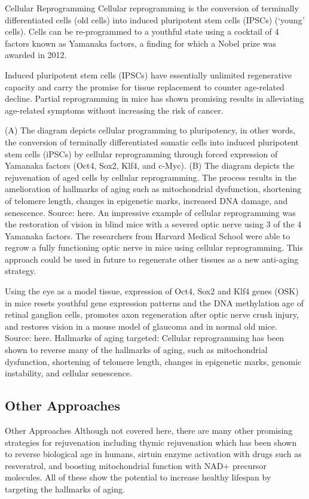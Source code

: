 \begin{frame}[c]{Cellular Reprogramming}
    Cellular reprogramming is the conversion of terminally differentiated cells (old cells) into induced pluripotent stem cells (IPSCs) (‘young’ cells). Cells can be re-programmed to a youthful state using a cocktail of 4 factors known as Yamanaka factors, a finding for which a Nobel prize was awarded in 2012. 

Induced pluripotent stem cells (IPSCs) have essentially unlimited regenerative capacity and carry the promise for tissue replacement to counter age-related decline. Partial reprogramming in mice has shown promising results in alleviating age-related symptoms without increasing the risk of cancer. 


(A) The diagram depicts cellular programming to pluripotency, in other words, the conversion of terminally differentiated somatic cells into induced pluripotent stem cells (iPSCs) by cellular reprogramming through forced expression of Yamanaka factors (Oct4, Sox2, Klf4, and c-Myc). (B) The diagram depicts the rejuvenation of aged cells by cellular reprogramming. The process results in the amelioration of hallmarks of aging such as mitochondrial dysfunction, shortening of telomere length, changes in epigenetic marks, increased DNA damage, and senescence. Source: here. 
An impressive example of cellular reprogramming was the restoration of vision in blind mice with a severed optic nerve using 3 of the 4 Yamanaka factors. The researchers from Harvard Medical School were able to regrow a fully functioning optic nerve in mice using cellular reprogramming. This approach could be used in future to regenerate other tissues as a new anti-aging strategy. 


Using the eye as a model tissue, expression of Oct4, Sox2 and Klf4 genes (OSK) in mice resets youthful gene expression patterns and the DNA methylation age of retinal ganglion cells, promotes axon regeneration after optic nerve crush injury, and restores vision in a mouse model of glaucoma and in normal old mice. Source: here. 
Hallmarks of aging targeted: Cellular reprogramming has been shown to reverse many of the hallmarks of aging, such as mitochondrial dysfunction, shortening of telomere length, changes in epigenetic marks, genomic instability, and cellular senescence.
\end{frame}


\subsection{Other Approaches}

\begin{frame}[c]{Other Approaches}
    Although not covered here, there are many other promising strategies for rejuvenation including thymic rejuvenation which has been shown to reverse biological age in humans, sirtuin enzyme activation with drugs such as resveratrol, and boosting mitochondrial function with NAD+ precursor molecules. All of these show the potential to increase healthy lifespan by targeting the hallmarks of aging.
\end{frame}
